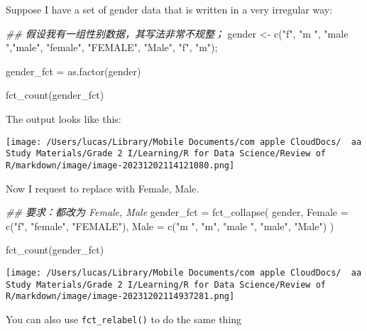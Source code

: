 \documentclass[
]{article}
\let\oldincludegraphics\includegraphics
\renewcommand{\includegraphics}[2][]{\begin{center}\oldincludegraphics[#1]{#2}\end{center}}
\newenvironment{Shaded}{}{}
\newcommand{\AttributeTok}[1]{\textcolor[rgb]{0.49,0.56,0.16}{#1}}
\newcommand{\DocumentationTok}[1]{\textcolor[rgb]{0.73,0.13,0.13}{\textit{#1}}}
\newcommand{\FunctionTok}[1]{\textcolor[rgb]{0.02,0.16,0.49}{#1}}
\newcommand{\NormalTok}[1]{#1}
\newcommand{\OtherTok}[1]{\textcolor[rgb]{0.00,0.44,0.13}{#1}}
\newcommand{\StringTok}[1]{\textcolor[rgb]{0.25,0.44,0.63}{#1}}
\begin{document}
Suppose I have a set of gender data that is written in a very irregular
way:

\begin{Shaded}
\begin{Highlighting}[]
\DocumentationTok{\#\# 假设我有一组性别数据，其写法非常不规整；}
\NormalTok{gender }\OtherTok{\textless{}{-}} \FunctionTok{c}\NormalTok{(}\StringTok{"f"}\NormalTok{, }\StringTok{"m "}\NormalTok{, }\StringTok{"male "}\NormalTok{,}\StringTok{"male"}\NormalTok{, }\StringTok{"female"}\NormalTok{, }\StringTok{"FEMALE"}\NormalTok{, }\StringTok{"Male"}\NormalTok{, }\StringTok{"f"}\NormalTok{, }\StringTok{"m"}\NormalTok{);}

\NormalTok{gender\_fct }\OtherTok{=}
  \FunctionTok{as.factor}\NormalTok{(gender)}

\FunctionTok{fct\_count}\NormalTok{(gender\_fct)}
\end{Highlighting}
\end{Shaded}

The output looks like this:

\texttt{[image: /Users/lucas/Library/Mobile Documents/com~apple~CloudDocs/~~aa Study Materials/Grade 2 I/Learning/R for Data Science/Review of R/markdown/image/image-20231202114121080.png]}

Now I request to replace with Female, Male.

\begin{Shaded}
\begin{Highlighting}[]
\DocumentationTok{\#\# 要求：都改为 Female, Male}
\NormalTok{gender\_fct }\OtherTok{=}
  \FunctionTok{fct\_collapse}\NormalTok{(}
\NormalTok{    gender,}
    \AttributeTok{Female =} \FunctionTok{c}\NormalTok{(}\StringTok{"f"}\NormalTok{, }\StringTok{"female"}\NormalTok{, }\StringTok{"FEMALE"}\NormalTok{),}
    \AttributeTok{Male =} \FunctionTok{c}\NormalTok{(}\StringTok{"m "}\NormalTok{, }\StringTok{"m"}\NormalTok{, }\StringTok{"male "}\NormalTok{, }\StringTok{"male"}\NormalTok{, }\StringTok{"Male"}\NormalTok{)}
\NormalTok{  )}

\FunctionTok{fct\_count}\NormalTok{(gender\_fct)}
\end{Highlighting}
\end{Shaded}

\texttt{[image: /Users/lucas/Library/Mobile Documents/com~apple~CloudDocs/~~aa Study Materials/Grade 2 I/Learning/R for Data Science/Review of R/markdown/image/image-20231202114937281.png]}

You can also use \texttt{fct\_relabel()} to do the same thing
\end{document}
